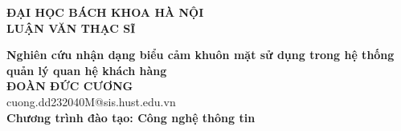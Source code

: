 \documentclass[LuanVan.tex]{subfiles}
\begin{document}
\begin{titlepage}
\thispagestyle{empty}
\begin{center}

{\textbf{\large{ĐẠI HỌC BÁCH KHOA HÀ NỘI}}}\\[4cm]

{\textbf{\huge{ LUẬN VĂN THẠC SĨ}}}\\[1cm]
{\textbf{\Large{Nghiên cứu nhận dạng biểu cảm khuôn mặt sử dụng trong hệ thống quản lý quan hệ khách hàng}}\\[1cm]

{\textbf{\large{ĐOÀN ĐỨC CƯƠNG}}}\\
{\large{cuong.dd232040M@sis.hust.edu.vn}}\\[0.5cm]

{\textbf{\large{Chương trình đào tạo: Công nghệ thông tin
}}}\\

\vspace{4cm}
\begin{table}[H]
\centering
{}
\end{table}}
\end{center}



\end{titlepage}
\end{document}
